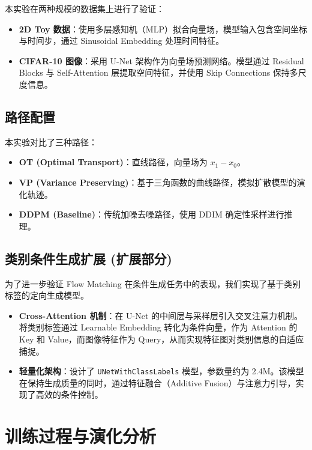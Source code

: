 \documentclass[11pt,a4paper]{article}
\begin{document}
本实验在两种规模的数据集上进行了验证：
\begin{itemize}
    \item \textbf{2D Toy 数据}：使用多层感知机（MLP）拟合向量场，模型输入包含空间坐标与时间步，通过 Sinusoidal Embedding 处理时间特征。
    \item \textbf{CIFAR-10 图像}：采用 U-Net 架构作为向量场预测网络。模型通过 Residual Blocks 与 Self-Attention 层提取空间特征，并使用 Skip Connections 保持多尺度信息。
\end{itemize}

\subsection{路径配置}

本实验对比了三种路径：
\begin{itemize}
    \item \textbf{OT (Optimal Transport)}：直线路径，向量场为 $x_1 - x_0$。
    \item \textbf{VP (Variance Preserving)}：基于三角函数的曲线路径，模拟扩散模型的演化轨迹。
    \item \textbf{DDPM (Baseline)}：传统加噪去噪路径，使用 DDIM 确定性采样进行推理。
\end{itemize}

\subsection{类别条件生成扩展 (扩展部分)}

为了进一步验证 Flow Matching 在条件生成任务中的表现，我们实现了基于类别标签的定向生成模型。

\begin{itemize}
    \item \textbf{Cross-Attention 机制}：在 U-Net 的中间层与采样层引入交叉注意力机制。将类别标签通过 Learnable Embedding 转化为条件向量，作为 Attention 的 Key 和 Value，而图像特征作为 Query，从而实现特征图对类别信息的自适应捕捉。
    \item \textbf{轻量化架构}：设计了 \texttt{UNetWithClassLabels} 模型，参数量约为 2.4M。该模型在保持生成质量的同时，通过特征融合（Additive Fusion）与注意力引导，实现了高效的条件控制。
\end{itemize}

\section{训练过程与演化分析}
\label{sec:training}
\end{document}
